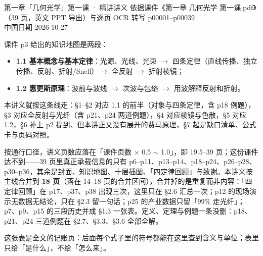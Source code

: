 \documentclass[11pt]{ctexart}
\begin{document}
%
{第一章「几何光学」第一课 · 精讲讲义}%
{依据课件《第一章 几何光学 第一课.pdf》（39 页，英文 PPT 导出）与逐页 OCR 转写 p00001--p00039\\中国日期 2026-10-27}



课件 p3 给出的知识地图是两段：
\begin{itemize}
  \item \textbf{1.1 基本概念与基本定律}：光源、光线、光束 $\rightarrow$ 四条定律（直线传播、独立传播、反射、折射/Snell）$\rightarrow$ 全反射 $\rightarrow$ 折射棱镜；
  \item \textbf{1.2 惠更斯原理}：波前与波线 $\rightarrow$ 次波与包络 $\rightarrow$ 用波解释反射和折射。
\end{itemize}
本讲义就按这条线走：§1--§2 对应 1.1 的前半（对象与四条定律，含 p18 例题），§3 对应全反射与光纤（含 p21、p24 两道例题），§4 对应棱镜与色散，§5 对应 1.2，§6 补上 p2 提到、但本讲正文没有展开的费马原理，§7 起是缺口清单、公式卡与页码对照。

按通行口径，讲义页数应落在「课件页数 $\times$ 0.5 $\sim$ 1.0」，即 19.5--39 页；这份课件达不到——39 页里真正承载信息的只有 p6--p11、p13--p14、p18--p24、p26--p28、p30--p36，其余是封面、知识地图、十层插图、「四定律回顾」与致谢。本讲义按主线合并到 \textbf{18 页}（落在 14--18 页的合并区间），合并掉的是重复而非内容：「四定律回顾」在 p17、p37、p38 出现三次，这里只在 §2.6 汇总一次；p12 的现场演示无数据无结论，只在 §2.3 留一句话；p25 的产业数据只留「99\% 走光纤」；p7、p9、p15 的三段历史并成 §1.3 一张表。定义、定理与例题一条没删：p18、p21、p24 三道例题在 §2.7、§3.3、§3.6 全部全解。

这张表是全文的记账页：后面每个式子里的符号都能在这里查到含义与单位；表里只给「是什么」，不给「怎么来」。
\end{document}

